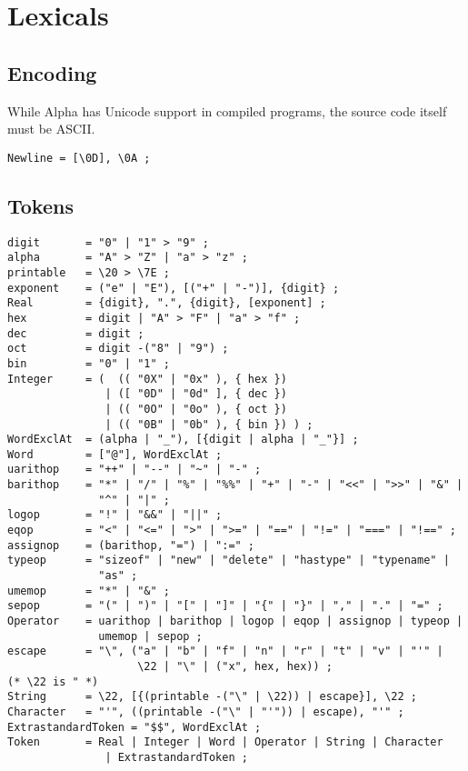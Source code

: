 \documentclass{article}
\begin{document}
\section{Lexicals}
\label{sec:lexicals}

\subsection{Encoding}
\label{sec:encoding}
While Alpha has Unicode support in compiled programs, the source code itself
must be ASCII.
\begin{verbatim}
Newline = [\0D], \0A ;
\end{verbatim}

\subsection{Tokens}
\label{sub:lexicals:tokens}
\begin{verbatim}
digit       = "0" | "1" > "9" ;
alpha       = "A" > "Z" | "a" > "z" ;
printable   = \20 > \7E ;
exponent    = ("e" | "E"), [("+" | "-")], {digit} ;
Real        = {digit}, ".", {digit}, [exponent] ;
hex         = digit | "A" > "F" | "a" > "f" ;
dec         = digit ;
oct         = digit -("8" | "9") ;
bin         = "0" | "1" ;
Integer     = (  (( "0X" | "0x" ), { hex })
               | ([ "0D" | "0d" ], { dec })
               | (( "0O" | "0o" ), { oct })
               | (( "0B" | "0b" ), { bin }) ) ;
WordExclAt  = (alpha | "_"), [{digit | alpha | "_"}] ;
Word        = ["@"], WordExclAt ;
uarithop    = "++" | "--" | "~" | "-" ;
barithop    = "*" | "/" | "%" | "%%" | "+" | "-" | "<<" | ">>" | "&" |
              "^" | "|" ;
logop       = "!" | "&&" | "||" ;
eqop        = "<" | "<=" | ">" | ">=" | "==" | "!=" | "===" | "!==" ;
assignop    = (barithop, "=") | ":=" ;
typeop      = "sizeof" | "new" | "delete" | "hastype" | "typename" |
              "as" ;
umemop      = "*" | "&" ;
sepop       = "(" | ")" | "[" | "]" | "{" | "}" | "," | "." | "=" ;
Operator    = uarithop | barithop | logop | eqop | assignop | typeop |
              umemop | sepop ;
escape      = "\", ("a" | "b" | "f" | "n" | "r" | "t" | "v" | "'" |
                    \22 | "\" | ("x", hex, hex)) ;
(* \22 is " *)
String      = \22, [{(printable -("\" | \22)) | escape}], \22 ;
Character   = "'", ((printable -("\" | "'")) | escape), "'" ;
ExtrastandardToken = "$$", WordExclAt ;
Token       = Real | Integer | Word | Operator | String | Character
               | ExtrastandardToken ;
\end{verbatim}
\end{document}
